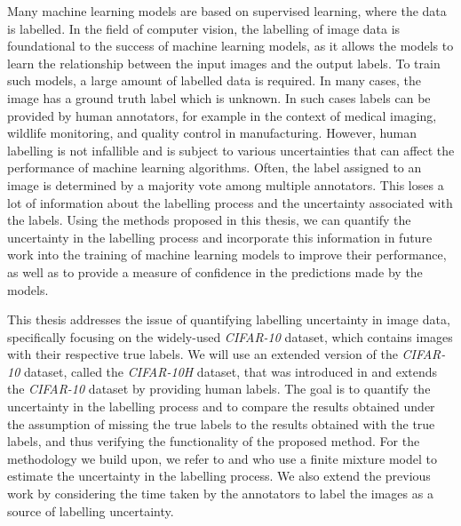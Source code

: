 Many machine learning models are based on supervised learning, where the data is
labelled. In the field of computer vision, the labelling of image data is
foundational to the success of machine learning models, as it allows the models
to learn the relationship between the input images and the output labels. To
train such models, a large amount of labelled data is required. In many cases,
the image has a ground truth label which is unknown. In such cases labels can be
provided by human annotators, for example in the context of medical imaging,
wildlife monitoring, and quality control in manufacturing. However, human
labelling is not infallible and is subject to various uncertainties that can
affect the performance of machine learning algorithms. Often, the label assigned
to an image is determined by a majority vote among multiple annotators. This
loses a lot of information about the labelling process and the uncertainty
associated with the labels. Using the methods proposed in this thesis, we can
quantify the uncertainty in the labelling process and incorporate this
information in future work into the training of machine learning models to
improve their performance, as well as to provide a measure of confidence in the
predictions made by the models.\bigskip

This thesis addresses the issue of quantifying labelling uncertainty in image
data, specifically focusing on the widely-used \textit{CIFAR-10} dataset,
which contains images with their respective true labels. We will use an extended
version of the \textit{CIFAR-10} dataset, called the \textit{CIFAR-10H} dataset,
that was introduced in \cite{petersonHumanUncertaintyMakes2019} and extends the
\textit{CIFAR-10} dataset by providing human labels. The goal is to quantify the
uncertainty in the labelling process and to compare the results obtained under
the assumption of missing the true labels to the results obtained with the true
labels, and thus verifying the functionality of the proposed method. For the
methodology we build upon, we refer to
\cite{hechingerCategorisingWorldLocal2024} and
\cite{mclachlanBayesianApproachMixture2000} 
who use a finite mixture model to
estimate the uncertainty in the labelling process. We also extend the previous
work by considering the time taken by the annotators to label the images as a
source of labelling uncertainty.\bigskip

